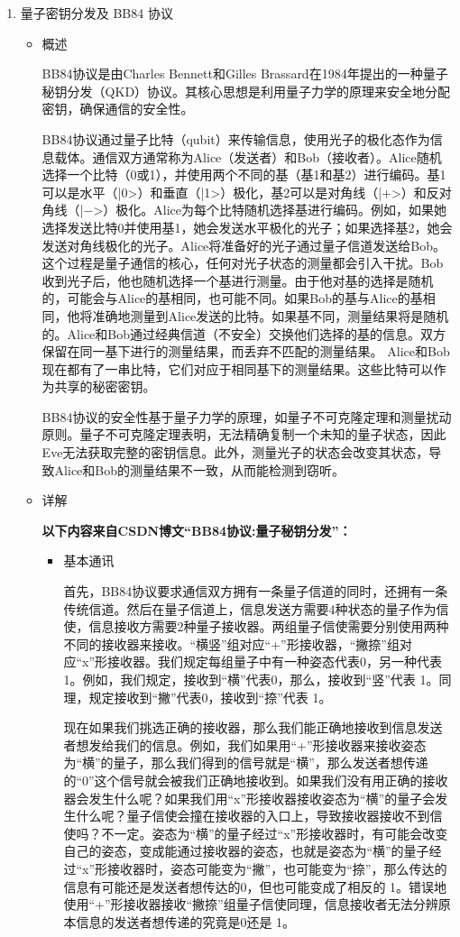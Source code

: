 \begin{enumerate}
	\item 量子密钥分发及 BB84 协议
	\begin{itemize}
		\item 概述
		
		BB84协议是由Charles Bennett和Gilles Brassard在1984年提出的一种量子秘钥分发（QKD）协议。其核心思想是利用量子力学的原理来安全地分配密钥，确保通信的安全性。
		
		BB84协议通过量子比特（qubit）来传输信息，使用光子的极化态作为信息载体。通信双方通常称为Alice（发送者）和Bob（接收者）。Alice随机选择一个比特（0或1），并使用两个不同的基（基1和基2）进行编码。基1可以是水平（|0>）和垂直（|1>）极化，基2可以是对角线（|+>）和反对角线（|−>）极化。Alice为每个比特随机选择基进行编码。例如，如果她选择发送比特0并使用基1，她会发送水平极化的光子；如果选择基2，她会发送对角线极化的光子。Alice将准备好的光子通过量子信道发送给Bob。这个过程是量子通信的核心，任何对光子状态的测量都会引入干扰。Bob收到光子后，他也随机选择一个基进行测量。由于他对基的选择是随机的，可能会与Alice的基相同，也可能不同。如果Bob的基与Alice的基相同，他将准确地测量到Alice发送的比特。如果基不同，测量结果将是随机的。Alice和Bob通过经典信道（不安全）交换他们选择的基的信息。双方保留在同一基下进行的测量结果，而丢弃不匹配的测量结果。 Alice和Bob现在都有了一串比特，它们对应于相同基下的测量结果。这些比特可以作为共享的秘密密钥。
		
		BB84协议的安全性基于量子力学的原理，如量子不可克隆定理和测量扰动原则。量子不可克隆定理表明，无法精确复制一个未知的量子状态，因此Eve无法获取完整的密钥信息。此外，测量光子的状态会改变其状态，导致Alice和Bob的测量结果不一致，从而能检测到窃听。
		
		\item 详解
		
		\textbf{以下内容来自CSDN博文“BB84协议:量子秘钥分发”：}
		\begin{itemize}
			\item 基本通讯
			
			首先，BB84协议要求通信双方拥有一条量子信道的同时，还拥有一条传统信道。然后在量子信道上，信息发送方需要4种状态的量子作为信使，信息接收方需要2种量子接收器。两组量子信使需要分别使用两种不同的接收器来接收。“横竖”组对应“+”形接收器，“撇捺”组对应“x”形接收器。我们规定每组量子中有一种姿态代表0，另一种代表 1。例如，我们规定，接收到“横”代表0，那么，接收到“竖”代表 1。同理，规定接收到“撇”代表0，接收到“捺”代表 1。
			
			现在如果我们挑选正确的接收器，那么我们能正确地接收到信息发送者想发给我们的信息。例如，我们如果用“+”形接收器来接收姿态为“横”的量子，那么我们得到的信号就是“横”，那么发送者想传递的“0”这个信号就会被我们正确地接收到。如果我们没有用正确的接收器会发生什么呢？如果我们用“x”形接收器接收姿态为“横”的量子会发生什么呢？量子信使会撞在接收器的入口上，导致接收器接收不到信使吗？不一定。姿态为“横”的量子经过“x”形接收器时，有可能会改变自己的姿态，变成能通过接收器的姿态，也就是姿态为“横”的量子经过“x”形接收器时，姿态可能变为“撇”，也可能变为“捺”，那么传达的信息有可能还是发送者想传达的0，但也可能变成了相反的 1。错误地使用“+”形接收器接收“撇捺”组量子信使同理，信息接收者无法分辨原本信息的发送者想传递的究竟是0还是 1。
			

\end{itemize}
\end{itemize}
\end{enumerate}
